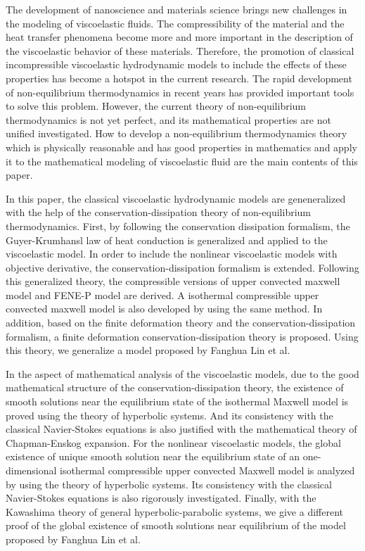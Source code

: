 \begin{eabstract}
  \noindent The development of nanoscience and materials science brings new challenges in the modeling of viscoelastic fluids. The compressibility of the material and the heat transfer phenomena become more and more important in the description of the viscoelastic behavior of these materials. Therefore, the promotion of classical incompressible viscoelastic hydrodynamic models to include the effects of these properties has become a hotspot in the current research. The rapid development of non-equilibrium thermodynamics in recent years has provided important tools to solve this problem. However, the current theory of non-equilibrium thermodynamics is not yet perfect, and its mathematical properties are not unified investigated. How to develop a non-equilibrium thermodynamics theory which is physically reasonable and has good properties in mathematics and apply it to the mathematical modeling of viscoelastic fluid are the main contents of this paper.
  
  In this paper, the classical viscoelastic hydrodynamic models are geneneralized with the help of the conservation-dissipation theory of non-equilibrium thermodynamics. First, by following the conservation dissipation formalism, the Guyer-Krumhansl law of heat conduction is generalized and applied to the viscoelastic model. In order to include the nonlinear viscoelastic models with objective derivative, the conservation-dissipation formalism is extended. Following this generalized theory, the compressible versions of upper convected maxwell model and FENE-P model are derived. A isothermal compressible upper convected maxwell model is also developed by using the same method. In addition, based on the finite deformation theory and the conservation-dissipation formalism, a finite deformation conservation-dissipation theory is proposed. Using this theory, we generalize a model proposed by Fanghua Lin et al.

  In the aspect of mathematical analysis of the viscoelastic models, due to the good mathematical structure of the conservation-dissipation theory, the existence of smooth solutions near the equilibrium state of the isothermal Maxwell model is proved using the theory of hyperbolic systems. And its consistency with the classical Navier-Stokes equations is also justified with the mathematical theory of Chapman-Enskog expansion. For the nonlinear viscoelastic models, the global existence of unique smooth solution near the equilibrium state of an one-dimensional isothermal compressible upper convected Maxwell model is analyzed by using the theory of hyperbolic systems. Its consistency with the classical Navier-Stokes equations is also rigorously investigated. 
  Finally, with the Kawashima theory of general hyperbolic-parabolic systems, we give a different proof of the global existence of smooth solutions near equilibrium of the model proposed by Fanghua Lin et al.
  

\end{eabstract}

